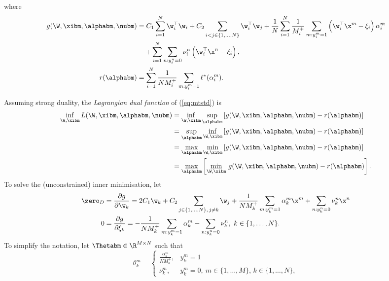 where 
\begin{equation*}
\begin{aligned}
g(\W, \xibm, \alphabm, \nubm)
&= C_1 \sum_{i=1}^{N} \w_i^\top \w_i + C_2 \sum_{i < j \in \{1,\dots,N\}} \w_i^\top \w_j
   + \frac{1}{N} \sum_{i = 1}^{N} \frac{1}{M_i^+} \sum_{m: y_i^m = 1} \left( \w_i^\top \x^m - \xi_i \right) \alpha_i^m \\
& \quad + \sum_{i=1}^{N} \sum_{n: y_i^n = 0} \nu_i^n \left( \w_i^\top \x^n - \xi_i \right), \\
r(\alphabm) &= \sum_{i = 1}^{N} \frac{1}{N M_i^+} \sum_{m: y_i^m = 1} \ell^*(\alpha_i^m).
\end{aligned}
\end{equation*}

Assuming strong duality, the \emph{Lagrangian dual function} of (\ref{eq:mtstd}) is
\begin{equation*}
\begin{aligned}
\inf_{\W, \xibm} L(\W, \xibm, \alphabm, \nubm)
&= \inf_{\W, \xibm} \sup_\alphabm \left[ g(\W, \xibm, \alphabm, \nubm) - r(\alphabm) \right] \\
&= \sup_\alphabm \inf_{\W, \xibm} \left[ g(\W, \xibm, \alphabm, \nubm) - r(\alphabm) \right] \\
&= \max_\alphabm \min_{\W, \xibm} \left[ g(\W, \xibm, \alphabm, \nubm) - r(\alphabm) \right] \\
&= \max_\alphabm \left[ \min_{\W, \xibm} \, g(\W, \xibm, \alphabm, \nubm) - r(\alphabm) \right].
\end{aligned}
\end{equation*}
To solve the (unconstrained) inner minimisation, let
\begin{equation*}
\begin{aligned}
\zero_D &= \frac{\partial g}{\partial \w_k} 
   = 2C_1 \w_k + C_2 \sum_{j \in \{1,\dots,N\}, \, j \ne k} \w_j 
     + \frac{1}{N M_k^+} \sum_{m: y_k^m = 1} \alpha_k^m \x^m
     + \sum_{n: y_k^n = 0} \nu_k^n \x^n \\
0 &= \frac{\partial g}{\partial \xi_k} 
   = -\frac{1}{N M_k^+} \sum_{m: y_k^m = 1} \alpha_k^m - \sum_{n: y_k^n = 0} \nu_k^n,
   \ k \in \{1,\dots,N\}.
\end{aligned}
\end{equation*}
To simplify the notation, let $\Thetabm \in \R^{M \times N}$ such that
\begin{equation*}
\theta_k^m = \begin{cases}
\frac{\alpha_k^m}{N M_k^+}, & y_k^m = 1 \\
\nu_k^m, & y_k^m = 0, \ m \in \{1,\dots,M\}, \, k \in \{1,\dots,N\},
\end{cases}
\end{equation*}
